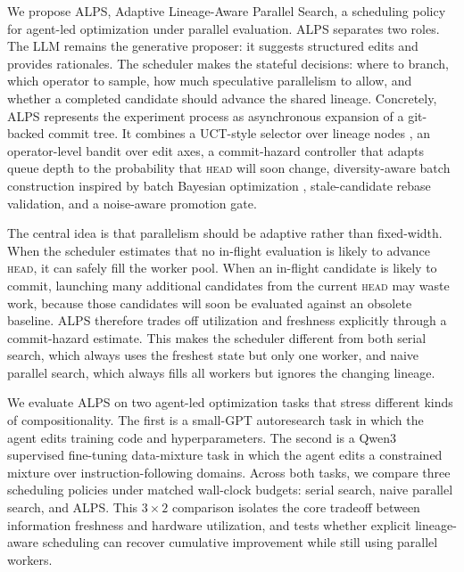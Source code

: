 \documentclass{article}
\newcommand{\alps}{ALPS\xspace}
\newcommand{\HEAD}{\textsc{head}\xspace}
\begin{document}
We propose \alps, Adaptive Lineage-Aware Parallel Search, a scheduling policy for agent-led optimization under parallel evaluation. \alps separates two roles. The LLM remains the generative proposer: it suggests structured edits and provides rationales. The scheduler makes the stateful decisions: where to branch, which operator to sample, how much speculative parallelism to allow, and whether a completed candidate should advance the shared lineage. Concretely, \alps represents the experiment process as asynchronous expansion of a git-backed commit tree. It combines a UCT-style selector over lineage nodes \citep{uct}, an operator-level bandit over edit axes, a commit-hazard controller that adapts queue depth to the probability that \HEAD will soon change, diversity-aware batch construction inspired by batch Bayesian optimization \citep{thompson_batch_bo,local_penalization}, stale-candidate rebase validation, and a noise-aware promotion gate.

The central idea is that parallelism should be adaptive rather than fixed-width. When the scheduler estimates that no in-flight evaluation is likely to advance \HEAD, it can safely fill the worker pool. When an in-flight candidate is likely to commit, launching many additional candidates from the current \HEAD may waste work, because those candidates will soon be evaluated against an obsolete baseline. \alps therefore trades off utilization and freshness explicitly through a commit-hazard estimate. This makes the scheduler different from both serial search, which always uses the freshest state but only one worker, and naive parallel search, which always fills all workers but ignores the changing lineage.

We evaluate \alps on two agent-led optimization tasks that stress different kinds of compositionality. The first is a small-GPT autoresearch task in which the agent edits training code and hyperparameters. The second is a Qwen3 supervised fine-tuning data-mixture task in which the agent edits a constrained mixture over instruction-following domains. Across both tasks, we compare three scheduling policies under matched wall-clock budgets: serial search, naive parallel search, and \alps. This $3 \times 2$ comparison isolates the core tradeoff between information freshness and hardware utilization, and tests whether explicit lineage-aware scheduling can recover cumulative improvement while still using parallel workers.
\end{document}
